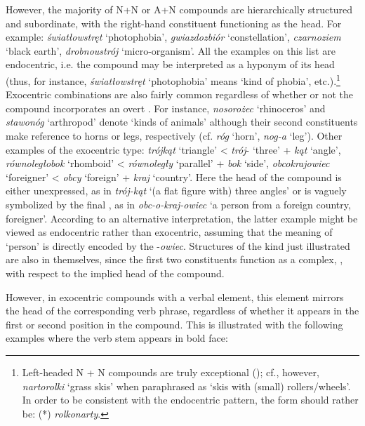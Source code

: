 \documentclass[output=paper]{LSP/langsci}
\begin{document}
However, the majority of  N+N or A+N compounds are hierarchically structured and subordinate, with the right-hand constituent functioning as the head. For example: \textit{światłowstręt} ‘photophobia’, \textit{gwiazdozbiór} ‘constellation’, \textit{czarnoziem} ‘black earth’, \textit{drobnoustrój} ‘micro-organism’. All the examples on this list are endocentric, i.e. the compound may be interpreted as a hyponym of its head (thus, for instance, \textit{światłowstręt} ‘photophobia’ means ‘kind of phobia’, etc.).\footnote{Left-headed N + N compounds are truly exceptional (\citealt[461]{GrzegorczykowaPuzynina1999}); cf., however, \textit{nartorolki} ‘grass skis’ when paraphrased as ‘skis with (small) rollers/wheels’. In order to be consistent with the  endocentric pattern, the form should rather be: (*) \textit{rolkonarty}.}  Exocentric combinations are also fairly common regardless of whether or not the compound incorporates an overt . For instance, \textit{nosorożec} ‘rhinoceros’ and \textit{stawonóg} ‘arthropod’ denote ‘kinds of animals’ although their second constituents make reference to horns or legs, respectively (cf. \textit{róg} ‘horn’, \textit{nog-a} ‘leg’). Other examples of the exocentric type: \textit{trójkąt} ‘triangle’ < \textit{trój}- ‘three’ + \textit{kąt} ‘angle’, \textit{równoległobok} ‘rhomboid’ < \textit{równoległy} ‘parallel’ + \textit{bok} ‘side’, \textit{obcokrajowiec} ‘foreigner’ < \textit{obcy} ‘foreign’ + \textit{kraj} ‘country’. Here the head of the compound is either unexpressed, as in \textit{trój-kąt} ‘(a flat figure with) three angles’ or is vaguely symbolized by the final , as in \textit{obc-o-kraj-owiec} ‘a person from a foreign country, foreigner’. According to an alternative interpretation, the latter example might be viewed as endocentric rather than exocentric, assuming that the meaning of ‘person’ is directly encoded by the  -\textit{owiec}. Structures of the kind just illustrated are also  in themselves, since the first two constituents function as a complex, ,  with respect to the implied head of the compound.



However, in exocentric compounds with a verbal element, this element mirrors the head of the corresponding verb phrase, regardless of whether it appears in the first or second position in the compound. This is illustrated with the following examples where the verb stem appears in bold face:
\end{document}

